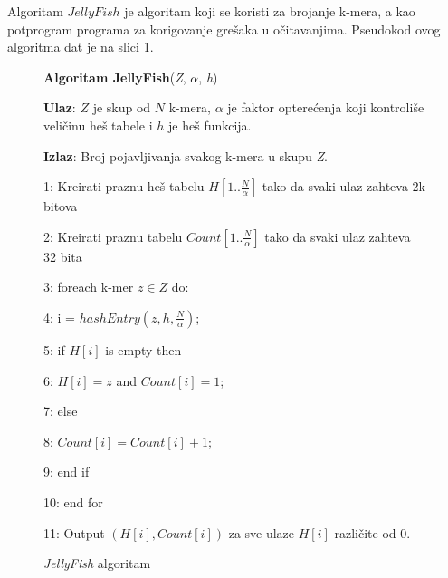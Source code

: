 \documentclass[12pt,oneside]{memoir}
\begin{document}
Algoritam $JellyFish$ je algoritam koji se koristi za brojanje k-mera, a kao potprogram programa za korigovanje grešaka u očitavanjima. Pseudokod ovog algoritma dat je na slici \ref{box:jellyfish}.

\begin{comment}

\begin{figure}[!ht]
  \centering
  \texttt{[image: Jellyfish.PNG]}
  \caption{Algoritam Jellyfish \cite{WingKinSung}}
  \label{fig:jellyfish}
\end{figure}

\end{comment}

\begin{figure}[!ht]
\begin{tcolorbox}
\textbf{Algoritam JellyFish}(\textit{Z}, $\alpha$, \textit{h})

\textbf{Ulaz}: $Z$ je skup od $N$ k-mera, $\alpha$ je faktor opterećenja koji kontroliše veličinu heš tabele i $h$ je heš funkcija.

\textbf{Izlaz}: Broj pojavljivanja svakog k-mera u skupu \textit{Z}.

1: Kreirati praznu heš tabelu $H[1..\frac{N}{\alpha}]$ tako da svaki ulaz zahteva 2k bitova

2: Kreirati praznu tabelu $Count[1..\frac{N}{\alpha}]$ tako da svaki ulaz zahteva 32 bita 

3: foreach k-mer $z \in Z$ do:

4:\hspace{1cm} i = $hashEntry(z, h, \frac{N}{\alpha})$;
    
5:\hspace{1cm} if $H[i]$ is empty then

6:\hspace{2cm} $H[i] = z$ and $Count[i] = 1$;

7:\hspace{1cm} else 

8:\hspace{2cm} $Count[i] = Count[i] + 1$;

9:\hspace{1cm} end if

10: end for

11: Output $(H[i], Count[i])$ za sve ulaze $H[i]$ različite od 0.
\end{tcolorbox}
\caption{\textit{JellyFish} algoritam \cite{WingKinSung}}
\label{box:jellyfish}
\end{figure}
\end{document}
